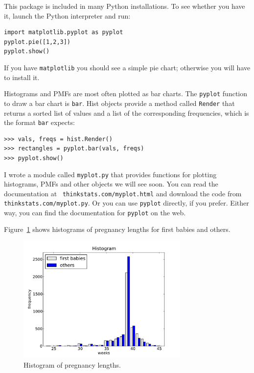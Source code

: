 \documentclass[12pt]{book}
\begin{document}
This package is included in many Python installations.  To see whether
you have it, launch the Python interpreter and run:
%
\begin{verbatim}
import matplotlib.pyplot as pyplot
pyplot.pie([1,2,3])
pyplot.show()
\end{verbatim}

If you have {\tt matplotlib} you should see a simple pie chart;
otherwise you will have to install it.

Histograms and PMFs are most often plotted as bar charts.  The
{\tt pyplot} function to draw a bar chart is {\tt bar}.  Hist
objects provide a method called {\tt Render} that returns a sorted
list of values and a list of the corresponding frequencies, which
is the format {\tt bar} expects:
%
\begin{verbatim}
>>> vals, freqs = hist.Render()
>>> rectangles = pyplot.bar(vals, freqs)
>>> pyplot.show()
\end{verbatim}

I wrote a module called {\tt myplot.py} that provides functions
for plotting histograms, PMFs and other objects we will see soon.
You can read the documentation at {\tt
  thinkstats.com/myplot.html} and download the code from {\tt
  thinkstats.com/myplot.py}.  Or you can use
{\tt pyplot} directly, if you prefer.  Either way, you can find
the documentation for {\tt pyplot} on the web.

Figure~\ref{nsfg_hist} shows histograms of pregnancy lengths for
first babies and others.

\begin{figure}
\centerline{\includegraphics[height=2.5in]{figs/nsfg_hist.pdf}}
\caption{Histogram of pregnancy lengths.}
\label{nsfg_hist}
\end{figure}
\end{document}
